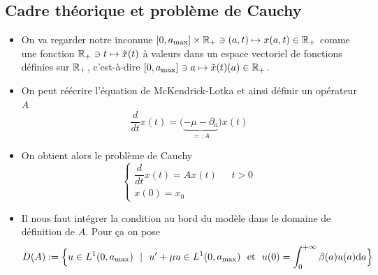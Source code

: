 \subsection{Cadre théorique et problème de Cauchy}
\begin{frame}
    \begin{itemize}
        \item On va \og regarder \fg{} notre inconnue $[0,a_{\max}] \times \mathbb{R}_+ \ni (a,t) \mapsto x(a,t) \in \mathbb{R}_+$ comme une fonction $\mathbb{R}_+ \ni t \mapsto \tilde{x}(t)$ à valeurs dans un espace vectoriel de fonctions définies sur $\mathbb{R}_+$, c'est-à-dire $[0,a_{\max}] \ni a \mapsto \tilde{x}(t)(a) \in \mathbb{R}_+$. \pause
        \item On peut réécrire l'équation de McKendrick-Lotka et ainsi définir un opérateur $A$
        \begin{equation*}
            \frac{d}{d t}x(t) = \big(\underbrace{-\mu - \partial_a}_{=:A}\big) x(t)
        \end{equation*} \pause
        \item On obtient alors le problème de Cauchy
        \begin{equation*}
            \left\{\begin{array}{lr}
                \dfrac{d}{d t}x(t) = Ax(t) & \ \ \ t >0 \\
                x(0) = x_0 &
            \end{array}\right.
        \end{equation*} \pause
        \item Il nous faut intégrer la condition au bord du modèle dans le domaine de définition de $A$. Pour ça on pose
        \begin{equation*}
            D(A) := \Big\{ u \in L^1(0,a_{\max}) \ \ | \ \ u'+\mu u \in L^1(0,a_{\max}) \ \text{ et } \ u(0) = \int_0^{+\infty}\beta(a)u(a)\d a \Big\}
        \end{equation*}
    \end{itemize}
\end{frame}

